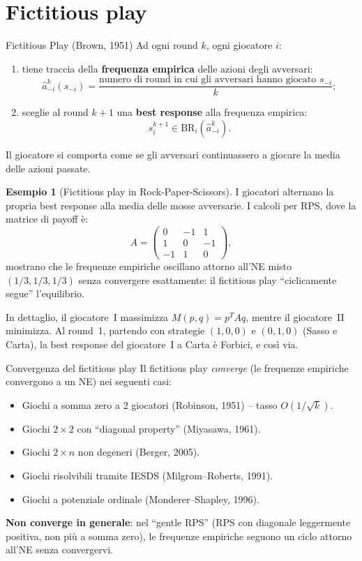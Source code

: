 \documentclass[12pt,a4paper,twoside]{book}
\theoremstyle{plain}
\theoremstyle{definition}
\newtheorem{example}[theorem]{Esempio}
\newcommand{\BR}{\mathrm{BR}}
\begin{document}
\section{Fictitious play}

\begin{defbox}{Fictitious Play (Brown, 1951)}
Ad ogni round $k$, ogni giocatore $i$:
\begin{enumerate}
  \item tiene traccia della \textbf{frequenza empirica} delle azioni degli avversari:
  \[
    \hat{a}_{-i}^k(s_{-i}) = \frac{\text{numero di round in cui gli avversari hanno giocato }s_{-i}}{k};
  \]
  \item sceglie al round $k+1$ una \textbf{best response} alla frequenza empirica:
  \[
    s_i^{k+1} \in \BR_i\!\left(\hat{a}_{-i}^k\right).
  \]
\end{enumerate}
Il giocatore si comporta come se gli avversari continuassero a giocare la media delle azioni passate.
\end{defbox}

\begin{example}[Fictitious play in Rock-Paper-Scissors]
I giocatori alternano la propria best response alla media delle mosse avversarie. I calcoli per RPS, dove la matrice di payoff è:
\[
  A = \begin{pmatrix} 0 & -1 & 1 \\ 1 & 0 & -1 \\ -1 & 1 & 0 \end{pmatrix},
\]
mostrano che le frequenze empiriche oscillano attorno all'NE misto $(1/3,1/3,1/3)$ senza convergere esattamente: il fictitious play ``ciclicamente segue'' l'equilibrio.

In dettaglio, il giocatore~I massimizza $M(p,q) = p^T A q$, mentre il giocatore~II minimizza. Al round~1, partendo con strategie $(1,0,0)$ e $(0,1,0)$ (Sasso e Carta), la best response del giocatore~I a Carta è Forbici, e così via.
\end{example}

\begin{thmbox}{Convergenza del fictitious play}
Il fictitious play \emph{converge} (le frequenze empiriche convergono a un NE) nei seguenti casi:
\begin{itemize}
  \item Giochi a somma zero a 2 giocatori (Robinson, 1951) -- tasso $O(1/\sqrt{k})$.
  \item Giochi $2\times 2$ con ``diagonal property'' (Miyasawa, 1961).
  \item Giochi $2\times n$ non degeneri (Berger, 2005).
  \item Giochi risolvibili tramite IESDS (Milgrom--Roberts, 1991).
  \item Giochi a potenziale ordinale (Monderer--Shapley, 1996).
\end{itemize}
\textbf{Non converge in generale}: nel ``gentle RPS'' (RPS con diagonale leggermente positiva, non più a somma zero), le frequenze empiriche seguono un ciclo attorno all'NE senza convergervi.
\end{thmbox}
\end{document}
